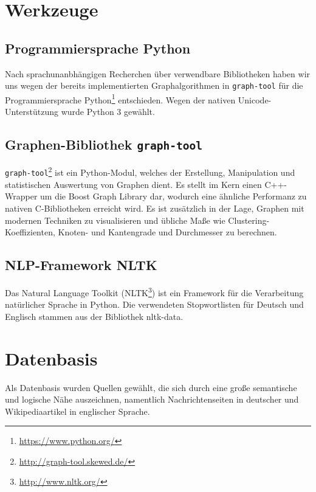 \documentclass[11pt, a4paper]{article}
\begin{document}
\section{Werkzeuge}

\subsection{Programmiersprache Python}
Nach sprachunanbhängigen Recherchen über verwendbare Bibliotheken haben wir uns
wegen der bereits implementierten Graphalgorithmen in \texttt{graph-tool} für
die Programmiersprache Python\footnote{\url{https://www.python.org/}}
entschieden.
Wegen der nativen Unicode-Unterstützung wurde Python 3 gewählt.

\subsection{Graphen-Bibliothek \texttt{graph-tool}}
\texttt{graph-tool}\footnote{\url{http://graph-tool.skewed.de/}} ist ein
Python-Modul, welches der Erstellung, Manipulation und statistischen
Auswertung von Graphen dient. Es stellt im Kern einen C++-Wrapper um die Boost
Graph Library dar, wodurch eine \"ahnliche Performanz zu nativen C-Bibliotheken
erreicht wird. Es ist zus\"atzlich in der Lage, Graphen mit modernen Techniken
zu visualisieren und \"ubliche Ma\ss{}e wie Clustering-Koeffizienten, Knoten-
und Kantengrade und Durchmesser zu berechnen.

\subsection{NLP-Framework NLTK}
Das Natural Language Toolkit (NLTK\footnote{\url{http://www.nltk.org/}}) ist
ein Framework f\"ur die Verarbeitung natürlicher Sprache in Python.
Die verwendeten Stopwortlisten für Deutsch und Englisch stammen aus der
Bibliothek nltk-data.


\section{Datenbasis}

Als Datenbasis wurden Quellen gew\"ahlt, die sich durch eine gro\ss{}e
semantische und logische N\"ahe auszeichnen, namentlich Nachrichtenseiten in
deutscher und Wikipediaartikel in englischer Sprache.
\end{document}
